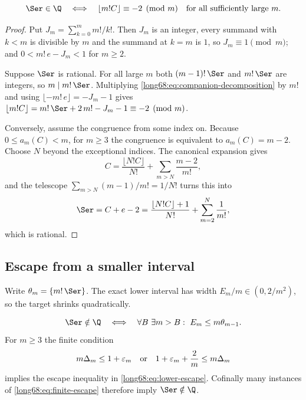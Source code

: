 \label{long68:res:lead-companion-orbit}
\begin{proposition}\label{long68:res:companion-orbit}
\[
 \Ser\in\Q
 \quad\Longleftrightarrow\quad
 \lfloor m!C\rfloor\equiv-2\pmod m
 \quad\hbox{for all sufficiently large }m.
\]
\end{proposition}

\begin{proof}
Put $J_m=\sum_{k=0}^{m}m!/k!$.  Then $J_m$ is an integer, every summand with
$k<m$ is divisible by $m$ and the summand at $k=m$ is $1$, so
$J_m\equiv1\pmod m$; and $0<m!\,e-J_m<1$ for $m\ge2$.

Suppose $\Ser$ is rational.  For all large $m$ both $(m-1)!\,\Ser$ and
$m!\,\Ser$ are integers, so $m\mid m!\,\Ser$.  Multiplying
\eqref{long68:eq:companion-decomposition} by $m!$ and using
$\lfloor -m!\,e\rfloor=-J_m-1$ gives
$\lfloor m!C\rfloor=m!\,\Ser+2\,m!-J_m-1\equiv-2\pmod m$.

Conversely, assume the congruence from some index on.  Because
$0\le a_m(C)<m$, for $m\ge3$ the congruence is equivalent to $a_m(C)=m-2$.
Choose $N$ beyond the exceptional indices.  The canonical expansion gives
\[
 C=\frac{\lfloor N!C\rfloor}{N!}+\sum_{m>N}\frac{m-2}{m!},
\]
and the telescope $\sum_{m>N}(m-1)/m!=1/N!$ turns this into
\[
 \Ser=C+e-2
 =\frac{\lfloor N!C\rfloor+1}{N!}+\sum_{m=2}^{N}\frac1{m!},
\]
which is rational.
\end{proof}

\subsection{Escape from a smaller interval}

Write $\theta_m=\{m!\,\Ser\}$.  The exact lower interval has width
$E_m/m\in(0,2/m^2)$, so the target shrinks quadratically.

\begin{proposition}\label{long68:res:lower-escape}
\begin{equation}\label{long68:eq:lower-escape}
 \Ser\notin\Q
 \quad\Longleftrightarrow\quad
 \forall B\ \exists m>B:\ E_m\le m\theta_{m-1}.
\end{equation}
For $m\ge3$ the finite condition
\begin{equation}\label{long68:eq:finite-escape}
 m\Delta_m\le1+\varepsilon_m
 \quad\hbox{or}\quad
 1+\varepsilon_m+\frac2m\le m\Delta_m
\end{equation}
implies the escape inequality in \eqref{long68:eq:lower-escape}.  Cofinally many
instances of \eqref{long68:eq:finite-escape} therefore imply $\Ser\notin\Q$.
\end{proposition}

